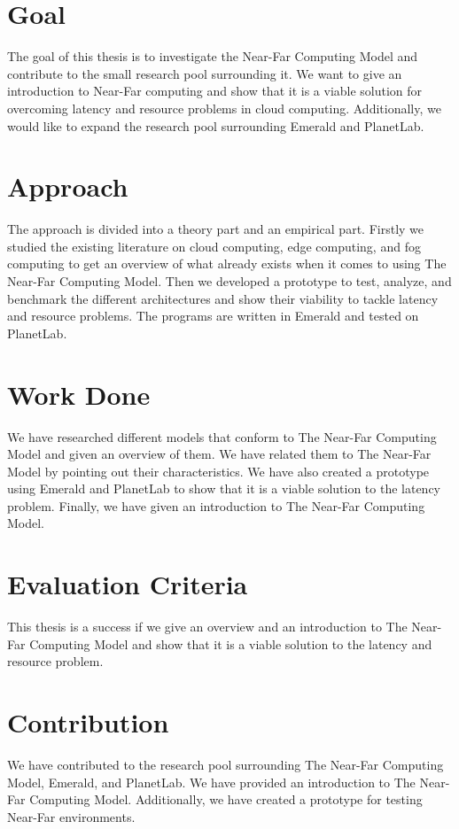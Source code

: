 \section{Goal}
The goal of this thesis is to investigate the Near-Far Computing Model and contribute to the small research pool surrounding it. We want to give an introduction to Near-Far computing and show that it is a viable solution for overcoming latency and resource problems in cloud computing. Additionally, we would like to expand the research pool surrounding Emerald and PlanetLab.

\section{Approach}
The approach is divided into a theory part and an empirical part. Firstly we studied the existing literature on cloud computing, edge computing, and fog computing to get an overview of what already exists when it comes to using The Near-Far Computing Model. Then we developed a prototype to test, analyze, and benchmark the different architectures and show their viability to tackle latency and resource problems. The programs are written in Emerald and tested on PlanetLab.


\section{Work Done}
We have researched different models that conform to The Near-Far Computing Model and given an overview of them. We have related them to The Near-Far Model by pointing out their characteristics. We have also created a prototype using Emerald and PlanetLab to show that it is a viable solution to the latency problem. Finally, we have given an introduction to The Near-Far Computing Model.

\section{Evaluation Criteria}
This thesis is a success if we give an overview and an introduction to The Near-Far Computing Model and show that it is a viable solution to the latency and resource problem.

\section{Contribution}
We have contributed to the research pool surrounding The Near-Far Computing Model, Emerald, and PlanetLab. We have provided an introduction to The Near-Far Computing Model. Additionally, we have created a prototype for testing Near-Far environments. 

